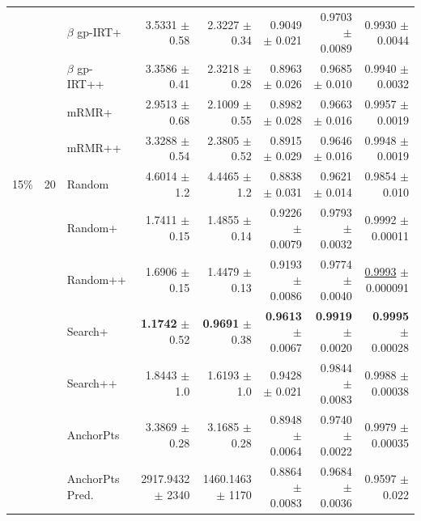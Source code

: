 \begin{longtable}{llp{}rrrrr}
 &  & $\beta$ gp-IRT+ & 3.5331 {\scriptsize $\pm$ 0.58} & 2.3227 {\scriptsize $\pm$ 0.34} & 0.9049 {\scriptsize $\pm$ 0.021} & 0.9703 {\scriptsize $\pm$ 0.0089} & 0.9930 {\scriptsize $\pm$ 0.0044} \\
 &  & $\beta$ gp-IRT++ & 3.3586 {\scriptsize $\pm$ 0.41} & 2.3218 {\scriptsize $\pm$ 0.28} & 0.8963 {\scriptsize $\pm$ 0.026} & 0.9685 {\scriptsize $\pm$ 0.010} & 0.9940 {\scriptsize $\pm$ 0.0032} \\
 &  & mRMR+ & 2.9513 {\scriptsize $\pm$ 0.68} & 2.1009 {\scriptsize $\pm$ 0.55} & 0.8982 {\scriptsize $\pm$ 0.028} & 0.9663 {\scriptsize $\pm$ 0.016} & 0.9957 {\scriptsize $\pm$ 0.0019} \\
 &  & mRMR++ & 3.3288 {\scriptsize $\pm$ 0.54} & 2.3805 {\scriptsize $\pm$ 0.52} & 0.8915 {\scriptsize $\pm$ 0.029} & 0.9646 {\scriptsize $\pm$ 0.016} & 0.9948 {\scriptsize $\pm$ 0.0019} \\
\midrule
15\% & 20 & Random & 4.6014 {\scriptsize $\pm$ 1.2} & 4.4465 {\scriptsize $\pm$ 1.2} & 0.8838 {\scriptsize $\pm$ 0.031} & 0.9621 {\scriptsize $\pm$ 0.014} & 0.9854 {\scriptsize $\pm$ 0.010} \\
 &  & Random+ & 1.7411 {\scriptsize $\pm$ 0.15} & 1.4855 {\scriptsize $\pm$ 0.14} & 0.9226 {\scriptsize $\pm$ 0.0079} & 0.9793 {\scriptsize $\pm$ 0.0032} & 0.9992 {\scriptsize $\pm$ 0.00011} \\
 &  & Random++ & 1.6906 {\scriptsize $\pm$ 0.15} & 1.4479 {\scriptsize $\pm$ 0.13} & 0.9193 {\scriptsize $\pm$ 0.0086} & 0.9774 {\scriptsize $\pm$ 0.0040} & \underline{0.9993} {\scriptsize $\pm$ 0.000091} \\
 &  & Search+ & \textbf{1.1742} {\scriptsize $\pm$ 0.52} & \textbf{0.9691} {\scriptsize $\pm$ 0.38} & \textbf{0.9613} {\scriptsize $\pm$ 0.0067} & \textbf{0.9919} {\scriptsize $\pm$ 0.0020} & \textbf{0.9995} {\scriptsize $\pm$ 0.00028} \\
 &  & Search++ & 1.8443 {\scriptsize $\pm$ 1.0} & 1.6193 {\scriptsize $\pm$ 1.0} & 0.9428 {\scriptsize $\pm$ 0.021} & 0.9844 {\scriptsize $\pm$ 0.0083} & 0.9988 {\scriptsize $\pm$ 0.00038} \\
 &  & AnchorPts & 3.3869 {\scriptsize $\pm$ 0.28} & 3.1685 {\scriptsize $\pm$ 0.28} & 0.8948 {\scriptsize $\pm$ 0.0064} & 0.9740 {\scriptsize $\pm$ 0.0022} & 0.9979 {\scriptsize $\pm$ 0.00035} \\
 &  & AnchorPts Pred. & 2917.9432 {\scriptsize $\pm$ 2340} & 1460.1463 {\scriptsize $\pm$ 1170} & 0.8864 {\scriptsize $\pm$ 0.0083} & 0.9684 {\scriptsize $\pm$ 0.0036} & 0.9597 {\scriptsize $\pm$ 0.022} \\

\end{longtable}
